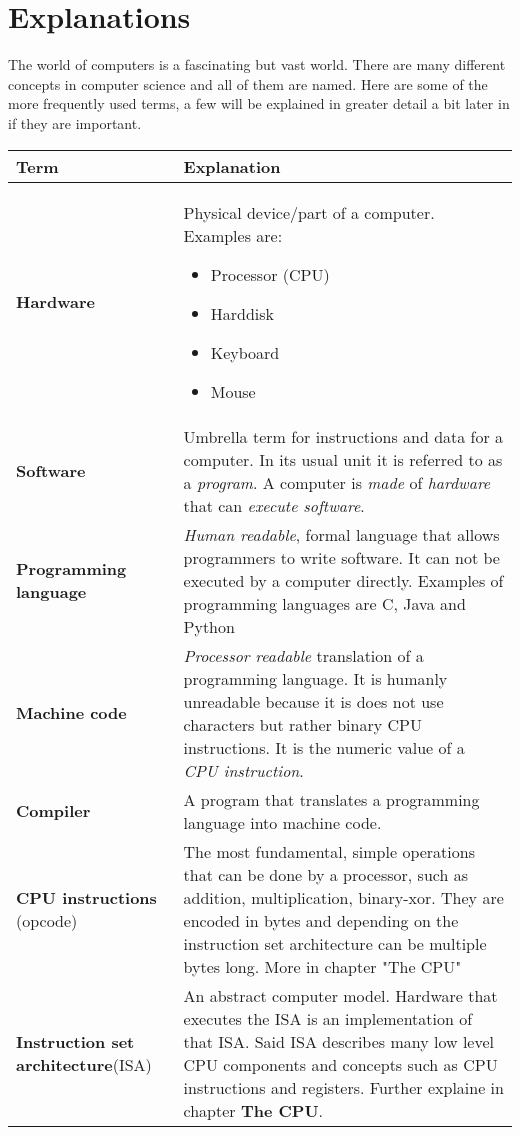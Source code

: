 \section{Explanations}
The world of computers is a fascinating but vast world. There are many different concepts in computer science and all of them are named.
Here are some of the more frequently used terms, a few will be explained in greater detail a bit later in if they are important.

\begin{tabular}{ | m{30mm} | m{120mm} |}
\textbf{Term} & \textbf{Explanation} \\
\hline
\textbf{Hardware} & Physical device/part of a computer. Examples are: \begin{itemize}
\item Processor (CPU)
\item Harddisk
\item Keyboard
\item Mouse
\end{itemize} \\
\textbf{Software} & Umbrella term for instructions and data for a computer. In its usual unit it is referred to as a \textit{program}. A computer is \textit{made} of \textit{hardware} that can \textit{execute software}. \\
\textbf{Programming language} & \textit{Human readable}, formal language that allows programmers to write software. It can not be executed by a computer directly. Examples of programming languages are C, Java and Python \\
\textbf{Machine code} & \textit{Processor readable} translation of a programming language. It is humanly unreadable because it is does not use characters but rather binary CPU instructions. It is the numeric value of a \textit{CPU instruction}. \\
\textbf{Compiler} & A program that translates a programming language into machine code. \\
\textbf{CPU instructions} (opcode) & The most fundamental, simple operations that can be done by a processor, such as addition, multiplication, binary-xor. They are encoded in bytes and depending on the instruction set architecture can be multiple bytes long. More in chapter "The CPU" \\
        \textbf{Instruction set architecture}(ISA) & An abstract computer model. Hardware that executes the ISA is an implementation of that ISA. Said ISA describes many low level CPU components and concepts such as CPU instructions and registers. Further explaine in chapter \textbf{The CPU}. \\

\end{tabular}
